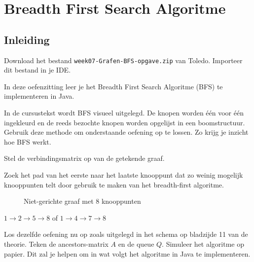 
\chapter{Breadth First Search Algoritme}
\section*{Inleiding}
Download het bestand \verb/week07-Grafen-BFS-opgave.zip/ van Toledo. Importeer dit bestand in je IDE.

In deze oefenzitting leer je het Breadth First Search Algoritme (BFS) te implementeren in Java. 



\begin{oef}
\papier In de cursustekst wordt BFS visueel uitgelegd. De knopen worden één voor één ingekleurd en de reeds bezochte knopen worden opgelijst in een boomstructuur. Gebruik deze methode om onderstaande oefening op te lossen. Zo krijg je inzicht hoe BFS werkt.
\label{BFS:papier}
\begin{oefenumerate}
\item Stel de verbindingsmatrix op van de getekende graaf.
\item Zoek het  pad van het eerste naar het laatste knooppunt dat zo weinig mogelijk knooppunten telt door gebruik te maken van het breadth-first algoritme.
\end{oefenumerate}
\begin{figure}[htbp]
\begin{center}

\caption{Niet-gerichte graaf met 8 knooppunten}
\label{fig:graaf}
\end{center}
\end{figure}

%
\begin{opl}
$1\rightarrow2\rightarrow5\rightarrow8$ of $1\rightarrow4\rightarrow7\rightarrow8$
\end{opl}

\end{oef}

\begin{oef}
\papier Los dezelfde oefening nu op zoals uitgelegd in het schema op bladzijde 11 van de theorie. Teken de ancestors-matrix $A$ en de queue $Q$. Simuleer het algoritme op papier. Dit zal je helpen om in wat volgt het algoritme in Java te implementeren.
\end{oef}

